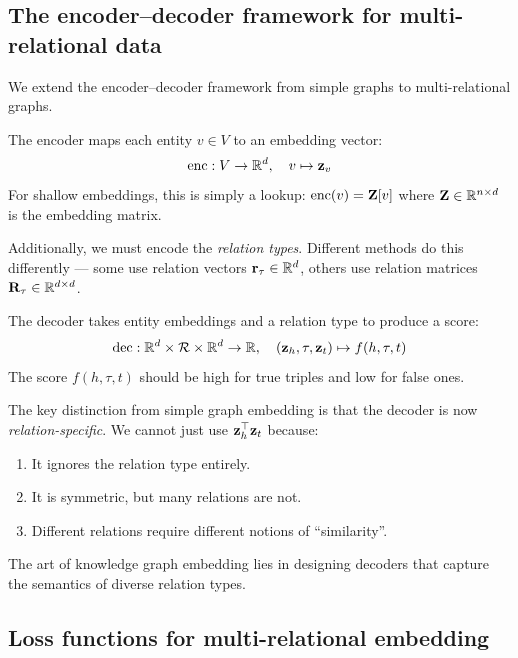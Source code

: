 \begin{notechapter}
\subsection{The encoder--decoder framework for multi-relational data}

We extend the encoder--decoder framework from simple graphs to multi-relational graphs.

\begin{definition}
The encoder maps each entity $v \in V$ to an embedding vector:
\[
\text{enc}: V \to \mathbb{R}^d, \quad v \mapsto \mathbf{z}_v
\]
For shallow embeddings, this is simply a lookup: $\text{enc}(v) = \mathbf{Z}[v]$ where $\mathbf{Z} \in \mathbb{R}^{n \times d}$ is the embedding matrix.

Additionally, we must encode the \emph{relation types}. Different methods do this differently --- some use relation vectors $\mathbf{r}_\tau \in \mathbb{R}^d$, others use relation matrices $\mathbf{R}_\tau \in \mathbb{R}^{d \times d}$.
\end{definition}

\begin{definition}
The decoder takes entity embeddings and a relation type to produce a score:
\[
\text{dec}: \mathbb{R}^d \times \mathcal{R} \times \mathbb{R}^d \to \mathbb{R}, \quad (\mathbf{z}_h, \tau, \mathbf{z}_t) \mapsto f(h, \tau, t)
\]
The score $f(h, \tau, t)$ should be high for true triples and low for false ones.
\end{definition}

\begin{keyidea}
The key distinction from simple graph embedding is that the decoder is now \emph{relation-specific}. We cannot just use $\mathbf{z}_h^\top \mathbf{z}_t$ because:
\begin{enumerate}
    \item It ignores the relation type entirely.
    \item It is symmetric, but many relations are not.
    \item Different relations require different notions of ``similarity''.
\end{enumerate}
The art of knowledge graph embedding lies in designing decoders that capture the semantics of diverse relation types.
\end{keyidea}

\subsection{Loss functions for multi-relational embedding}


\end{notechapter}
